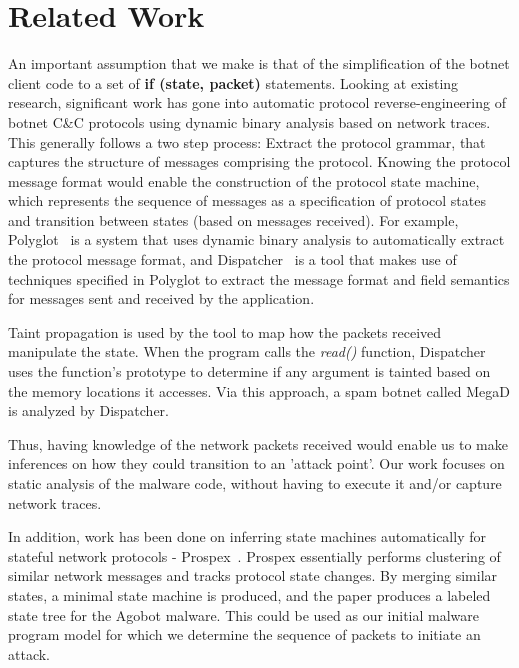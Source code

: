 \documentclass[]{article}
\begin{document}
\section{Related Work}
An important assumption that we make is that of the simplification of the botnet client code to a set of \textbf {if (state, packet)} statements. Looking at existing research, significant work has gone into automatic protocol reverse-engineering of botnet C\&C protocols using dynamic binary analysis based on network traces. This generally follows a two step process: Extract the protocol grammar, that captures the structure of messages comprising the protocol. Knowing the protocol message format would enable the construction of the protocol state machine, which represents the sequence of messages as a specification of protocol states and transition between states (based on messages received). 
For example, Polyglot~\cite{polyglot} is a system that uses dynamic binary analysis to automatically extract the protocol message format, and Dispatcher~\cite{dispatcher} is a tool that makes use of techniques specified in Polyglot to extract the message format and field semantics for messages sent and received by the application.

Taint propagation is used by the tool to map how the packets received manipulate the state. When the program calls the \textit{read()} function, Dispatcher uses the function's prototype to determine if any argument is tainted based on the memory locations it accesses. Via this approach, a spam botnet called MegaD is analyzed by Dispatcher.

Thus, having knowledge of the network packets received would enable us to make inferences on how they could transition to an 'attack point'. Our work focuses on static analysis of the malware code, without having to execute it and/or capture network traces.

In addition, work has been done on inferring state machines automatically for stateful network protocols - Prospex~\cite{prospex}. Prospex essentially performs clustering of similar network messages and tracks protocol state changes. By merging similar states, a minimal state machine is produced, and the paper produces a labeled state tree for the Agobot malware. This could be used as our initial malware program model for which we determine the sequence of packets to initiate an attack.




\end{document}
